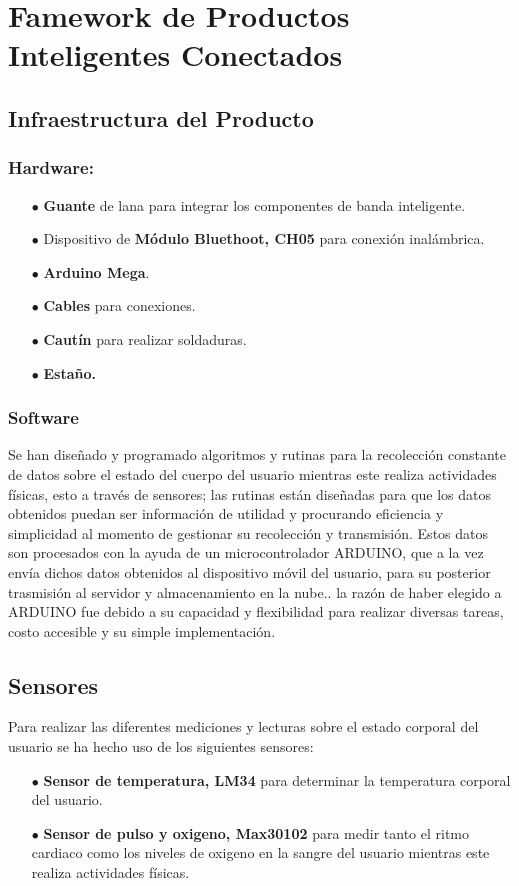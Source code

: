 \documentclass[osajnl,twocolumn,showpacs,superscriptaddress,10pt]{revtex4-1}
\begin{document}
\section{Famework de Productos Inteligentes Conectados}
\subsection{Infraestructura del Producto}
\subsubsection{Hardware:}
\begin{itemize}
    \item[$\bullet$]\textbf{Guante} de lana para integrar los componentes de banda inteligente.
    \item[$\bullet$]Dispositivo de \textbf{Módulo Bluethoot, CH05} para conexión inalámbrica.
    \item[$\bullet$]\textbf{Arduino Mega}.
    \item[$\bullet$]\textbf{Cables} para conexiones.
    \item[$\bullet$]\textbf{Cautín} para realizar soldaduras.
    \item[$\bullet$]\textbf{Estaño.}
\end{itemize}
\subsubsection{Software}
    Se han diseñado y programado algoritmos y rutinas para la recolección constante de datos sobre el estado del cuerpo del usuario mientras este realiza actividades físicas, esto a través de sensores; las rutinas están diseñadas para que los datos obtenidos puedan ser información de utilidad y procurando eficiencia y simplicidad al momento de gestionar su recolección y transmisión. Estos datos son procesados con la ayuda de un microcontrolador ARDUINO, que a la vez envía dichos datos obtenidos al dispositivo móvil del usuario, para su posterior trasmisión al servidor y almacenamiento en la nube.. la razón de haber elegido a ARDUINO fue debido a su capacidad y flexibilidad para realizar diversas tareas, costo accesible y su simple implementación.
    
\subsection{Sensores}
Para realizar las diferentes mediciones y lecturas sobre el estado corporal del usuario se ha hecho uso de los siguientes sensores:
\begin{itemize}
    \item[$\bullet$]\textbf{Sensor de temperatura, LM34} para determinar la temperatura corporal del usuario.
    \item[$\bullet$]\textbf{Sensor de pulso y oxigeno, Max30102} para medir tanto el ritmo cardiaco como los niveles de oxigeno en la sangre del usuario mientras este realiza actividades físicas.
\end{itemize}
\end{document}
